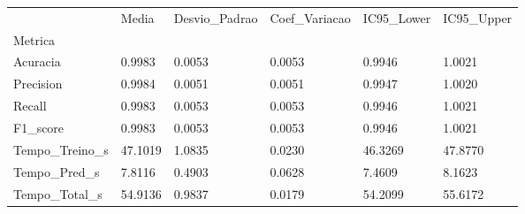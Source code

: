 \begin{tabular}{llllll}
\toprule
 & Media & Desvio_Padrao & Coef_Variacao & IC95_Lower & IC95_Upper \\
Metrica &  &  &  &  &  \\
\midrule
Acuracia & 0.9983 & 0.0053 & 0.0053 & 0.9946 & 1.0021 \\
Precision & 0.9984 & 0.0051 & 0.0051 & 0.9947 & 1.0020 \\
Recall & 0.9983 & 0.0053 & 0.0053 & 0.9946 & 1.0021 \\
F1_score & 0.9983 & 0.0053 & 0.0053 & 0.9946 & 1.0021 \\
Tempo_Treino_s & 47.1019 & 1.0835 & 0.0230 & 46.3269 & 47.8770 \\
Tempo_Pred_s & 7.8116 & 0.4903 & 0.0628 & 7.4609 & 8.1623 \\
Tempo_Total_s & 54.9136 & 0.9837 & 0.0179 & 54.2099 & 55.6172 \\
\bottomrule
\end{tabular}
